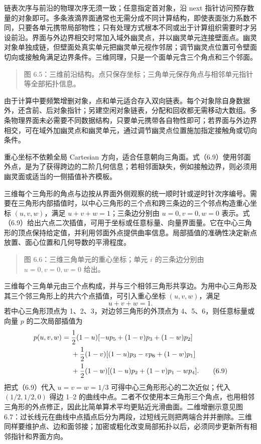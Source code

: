 \documentclass[11pt,a4paper,openany,fontset=none]{ctexbook}
\begin{document}
链表次序与前沿的物理次序无须一致；任意指定首对象，沿 next 指针访问预存数量的对象即可。多条液滴界面通常也无需分成不同计算结构，即使表面张力系数不同，只要各单元携带局部物性；只有处理方式根本不同或出于计算组织需要时才另设前沿。界面与外边界相交时常加入域外幽灵点，并以幽灵单元连接壁面点。幽灵对象单独成链，但壁面处真实单元把幽灵单元视作邻居；调节幽灵点位置可令壁面切向或接触角满足边界条件。三维同理，只是一个面单元含三个角点和三个邻面。

\begin{quote}\small 图 6.5：三维前沿结构。点只保存坐标；三角单元保存角点与相邻单元指针等全部拓扑信息。\end{quote}
由于计算中要频繁增删对象，点和单元适合存入双向链表。每个对象除自身数据外，还含前、后对象指针；另建空闲对象链表，分配和回收都无需移动大数组。多条物理界面未必需要不同数据结构，只要单元携带各自物性即可；若界面与外边界相交，可在域外加幽灵点和幽灵单元，通过调节幽灵点位置施加指定接触角或切向条件。

重心坐标不依赖全局 Cartesian 方向，适合任意朝向三角面。式（6.9）使用邻面外点，是为了获得跨边的二阶几何信息；若相邻面缺失，例如接触边界，则必须用幽灵面或适当的一侧插值补齐模板。

三维每个三角形的角点与边按从界面外侧观察的统一顺时针或逆时针次序编号。需要在三角形内部插值时，以中心三角形的三个点和跨三条边的三个邻点构造重心坐标 $(u,v,w)$，满足 $u+v+w=1$；三条边分别由 $u=0,v=0,w=0$ 表示。式（6.9）给出六点二次插值，可用于坐标或任意标量、向量界面量。它在中心三角形的顶点保持给定值，并利用邻面外点提供曲率信息。局部插值的准确性决定新点放置、面心位置和几何导数的平滑程度。

\begin{quote}\small 图 6.6：三维三角单元的重心坐标；单元 $i$ 的三条边分别由 $u=0,v=0,w=0$ 给出。\end{quote}
三维每个三角单元由三个点构成，并与三个相邻三角形共享边。为用中心三角形及其三个邻三角形上的共六个点插值，可引入重心坐标 $(u,v,w)$，满足
\begin{equation}
u+v+w=1.
\tag{6.8}
\end{equation}
若中心三角形顶点为 1、2、3，对边邻三角形的外顶点为 4、5、6，则任意标量或向量 $p$ 的二次局部插值为
\begin{align}
p(u,v,w)={}&\frac12(1-u)[-up_5+(1-v)p_3+(1-w)p_2]\notag\\
&+\frac12(1-v)[(1-u)p_3-vp_6+(1-w)p_1]\notag\\
&+\frac12(1-w)[(1-u)p_2+(1-v)p_1-wp_4].
\tag{6.9}
\end{align}
把式（6.9）代入 $u=v=w=1/3$ 可得中心三角形形心的二次近似；代入 $(1/2,1/2,0)$ 得边 1--2 的曲线中点。二者不仅使用本三角形三个角点，也用相邻三角形的外点修正，因此比简单算术平均更贴近光滑曲面。二维增删示意见图 6.7：过长线元在曲线中点插点后分为两段，过短线元则把两端合并并删除。三维同样要维护点、边和面邻接；加密或粗化改变局部拓扑以后，必须同步更新所有相邻指针和界面方向。
\end{document}
